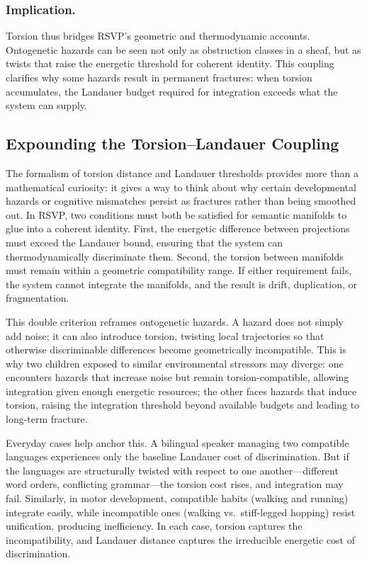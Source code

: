 \documentclass[a4paper,11pt]{article}
\begin{document}
\subsubsection{Implication.}
Torsion thus bridges RSVP’s geometric and thermodynamic accounts. Ontogenetic
hazards can be seen not only as obstruction classes in a sheaf, but as twists
that raise the energetic threshold for coherent identity. This coupling
clarifies why some hazards result in permanent fractures: when torsion
accumulates, the Landauer budget required for integration exceeds what the
system can supply.

\subsection{Expounding the Torsion--Landauer Coupling}

The formalism of torsion distance and Landauer thresholds provides more than a
mathematical curiosity: it gives a way to think about why certain developmental
hazards or cognitive mismatches persist as fractures rather than being smoothed
out. In RSVP, two conditions must both be satisfied for semantic manifolds to
glue into a coherent identity. First, the energetic difference between
projections must exceed the Landauer bound, ensuring that the system can
thermodynamically discriminate them. Second, the torsion between manifolds must
remain within a geometric compatibility range. If either requirement fails, the
system cannot integrate the manifolds, and the result is drift, duplication, or
fragmentation.

This double criterion reframes ontogenetic hazards. A hazard does not simply
add noise; it can also introduce torsion, twisting local trajectories so that
otherwise discriminable differences become geometrically incompatible. This is
why two children exposed to similar environmental stressors may diverge: one
encounters hazards that increase noise but remain torsion-compatible, allowing
integration given enough energetic resources; the other faces hazards that
induce torsion, raising the integration threshold beyond available budgets and
leading to long-term fracture.

Everyday cases help anchor this. A bilingual speaker managing two compatible
languages experiences only the baseline Landauer cost of discrimination. But if
the languages are structurally twisted with respect to one another—different
word orders, conflicting grammar—the torsion cost rises, and integration may
fail. Similarly, in motor development, compatible habits (walking and running) integrate easily,
while incompatible ones (walking vs.\ stiff-legged hopping) resist unification,
producing inefficiency. In each case, torsion captures the incompatibility,
and Landauer distance captures the irreducible energetic cost of
discrimination.
\end{document}
